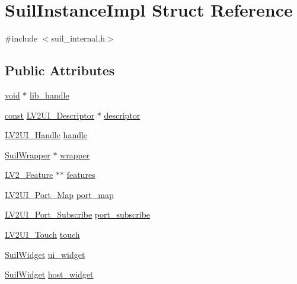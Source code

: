 \hypertarget{struct_suil_instance_impl}{}\section{Suil\+Instance\+Impl Struct Reference}
\label{struct_suil_instance_impl}


{\ttfamily \#include $<$suil\+\_\+internal.\+h$>$}

\subsection*{Public Attributes}
\begin{DoxyCompactItemize}
\item 
\hyperlink{sound_8c_ae35f5844602719cf66324f4de2a658b3}{void} $\ast$ \hyperlink{struct_suil_instance_impl_a9610986970d038d8d5191e8cd27189b7}{lib\+\_\+handle}
\item 
\hyperlink{getopt1_8c_a2c212835823e3c54a8ab6d95c652660e}{const} \hyperlink{ui_8h_aa63b4d775e5f2b4a8052f9412f9be21e}{L\+V2\+U\+I\+\_\+\+Descriptor} $\ast$ \hyperlink{struct_suil_instance_impl_a8270f346a69df6eb684aed10ffb82302}{descriptor}
\item 
\hyperlink{ui_8h_aea72a15db080a61e5e222fed84047e90}{L\+V2\+U\+I\+\_\+\+Handle} \hyperlink{struct_suil_instance_impl_a27fd779e1ff9248a50cf00dcdbef89c8}{handle}
\item 
\hyperlink{suil__internal_8h_ae19f6c4d775c4fc1141e4bfbfd8069cd}{Suil\+Wrapper} $\ast$ \hyperlink{struct_suil_instance_impl_ac1a0aada788cd64d0ee86e8e35dc32b1}{wrapper}
\item 
\hyperlink{lv2_8h_a78d13b607443404459db283371723234}{L\+V2\+\_\+\+Feature} $\ast$$\ast$ \hyperlink{struct_suil_instance_impl_ac4b02a3e25c5c0db85dca79a86ccca1b}{features}
\item 
\hyperlink{ui_8h_a5e98538d6a7903abc75fffaf6d8b9d10}{L\+V2\+U\+I\+\_\+\+Port\+\_\+\+Map} \hyperlink{struct_suil_instance_impl_a95a323c74d96ed214923e6b47938389c}{port\+\_\+map}
\item 
\hyperlink{ui_8h_ab464d9b2d932cda6b23d64295b256b51}{L\+V2\+U\+I\+\_\+\+Port\+\_\+\+Subscribe} \hyperlink{struct_suil_instance_impl_a05194c349aef7034546c5f5e6042ffea}{port\+\_\+subscribe}
\item 
\hyperlink{ui_8h_a0089327b3a0ba8338e7ac565d95edf4c}{L\+V2\+U\+I\+\_\+\+Touch} \hyperlink{struct_suil_instance_impl_a6bb87e7a38ae333ceefe9de1c495721b}{touch}
\item 
\hyperlink{group__suil_ga11e97b978f15e8b4273f3bc59265458f}{Suil\+Widget} \hyperlink{struct_suil_instance_impl_a259ac497128c4b01357a85eb6e6e507a}{ui\+\_\+widget}
\item 
\hyperlink{group__suil_ga11e97b978f15e8b4273f3bc59265458f}{Suil\+Widget} \hyperlink{struct_suil_instance_impl_afcece7fc83f7fbb9f13f0e3b6853e69c}{host\+\_\+widget}
\end{DoxyCompactItemize}


